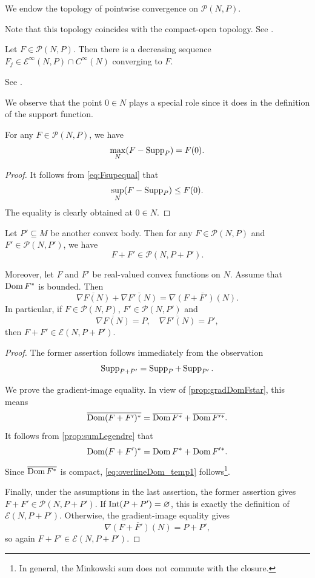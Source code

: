 \begin{definition}\label{def:pointwiseconv}
    We endow the topology of pointwise convergence on $\mathcal{P}(N,P)$.
\end{definition}
Note that this topology coincides with the compact-open topology. See \cite[Theorem~10.8]{Roc70}.

\begin{proposition}\label{prop:regularizationconvex}
    Let $F\in \mathcal{P}(N,P)$. Then there is a decreasing sequence $F_j\in \mathcal{E}^{\infty}(N,P)\cap C^{\infty}(N)$ converging to $F$.
\end{proposition}
See \cite[Lemma~2.2]{BB13}.

We observe that the point $0\in N$ plays a special role since it does in the definition of the support function.
\begin{proposition}\label{prop:convex:L462}
    For any $F\in \mathcal{P}(N,P)$, we have
    \[
    \max_{N}(F-\operatorname{Supp}_P)=F(0).
    \]
\end{proposition}
\begin{proof}
    It follows from \eqref{eq:Fsupequal} that
    \[
    \sup_{N}(F-\operatorname{Supp}_P)\leq F(0).
    \]
    The equality is clearly obtained at $0\in N$.
\end{proof}

\begin{lemma}\label{lma:grad_img_sum}
    Let $P'\subseteq M$ be another convex body. Then for any $F\in \mathcal{P}(N,P)$ and $F'\in \mathcal{P}(N,P')$, we have
    \[
    F+F'\in \mathcal{P}(N,P+P').
    \]

    Moreover, let $F$ and $F'$ be real-valued convex functions on $N$. Assume that $\operatorname{Dom} F^*$ is bounded. Then
    \[
    \overline{\nabla F(N)}+\overline{\nabla F'(N)}=\overline{\nabla (F+F')(N)}.
    \]
    In particular, if $F\in \mathcal{P}(N,P)$, $F'\in \mathcal{P}(N,P')$ and
    \[
    \overline{\nabla F(N)}=P,\quad \overline{\nabla F'(N)}=P',
    \]
    then $F+F'\in \mathcal{E}(N,P+P')$.
\end{lemma}
\begin{proof}
    The former assertion follows immediately from the observation
    \[
    \operatorname{Supp}_{P+P'}=\operatorname{Supp}_P+\operatorname{Supp}_{P'}.
    \]

    We prove the gradient-image equality. In view of \cref{prop:gradDomFstar}, this means
    \begin{equation}\label{eq:overlineDom_temp1}
    \overline{\operatorname{Dom} (F+F')^*}=\overline{\operatorname{Dom} F^*}+\overline{\operatorname{Dom} F'{}^*}.
    \end{equation}
    It follows from \cref{prop:sumLegendre} that
    \[
    \operatorname{Dom} (F+F')^*=\operatorname{Dom} F^*+\operatorname{Dom} F'{}^*.
    \]
    Since $\overline{\operatorname{Dom} F^*}$ is compact, \eqref{eq:overlineDom_temp1} follows\footnote{In general, the Minkowski sum does not commute with the closure.}.

    Finally, under the assumptions in the last assertion, the former assertion gives $F+F'\in\mathcal{P}(N,P+P')$. If $\operatorname{Int}(P+P')=\varnothing$, this is exactly the definition of $\mathcal{E}(N,P+P')$. Otherwise, the gradient-image equality gives
    \[
    \overline{\nabla (F+F')(N)}=P+P',
    \]
    so again $F+F'\in\mathcal{E}(N,P+P')$.
\end{proof}


